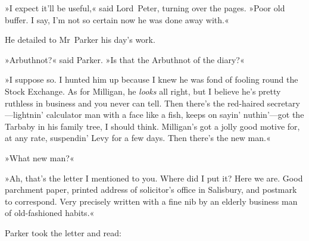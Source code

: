 »I expect it'll be useful,« said Lord~Peter, turning over the pages. »Poor old buffer. I say, I'm not so certain now he was done away with.«

He detailed to Mr~Parker his day's work.

»Arbuthnot?« said Parker. »Is that the Arbuthnot of the diary?«

»I suppose so. I hunted him up because I knew he was fond of fooling round the Stock Exchange. As for Milligan, he \textit{looks} all right, but I believe he's pretty ruthless in business and you never can tell. Then there's the red-haired secretary—lightnin' calculator man with a face like a fish, keeps on sayin' nuthin'---got the Tarbaby in his family tree, I should think. Milligan's got a jolly good motive for, at any rate, suspendin' Levy for a few days. Then there's the new man.«

»What new man?«

»Ah, that's the letter I mentioned to you. Where did I put it? Here we are. Good parchment paper, printed address of solicitor's office in Salisbury, and postmark to correspond. Very precisely written with a fine nib by an elderly business man of old-fashioned habits.«

Parker took the letter and read:

\makeatletter
{}
{%
\clearpage
}{%

}
\makeatother


